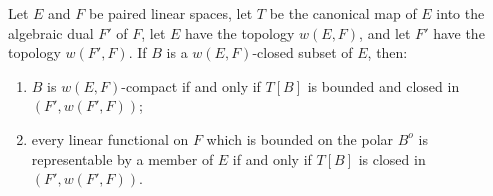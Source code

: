 Let $E$ and $F$ be paired linear spaces, let $T$ be the canonical map of $E$ into the algebraic dual $F'$ of $F$, let $E$ have the topology $w(E,F)$, and let $F'$ have the topology $w(F',F)$. If $B$ is a $w(E,F)$-closed subset of $E$, then:

\begin{enumerate}
\item[(a)] $B$ is $w(E,F)$-compact if and only if $T[B]$ is bounded and closed in $(F', w(F',F))$;
\item[(b)] every linear functional on $F$ which is bounded on the polar $B^{o}$ is representable by a member of $E$ if and only if $T[B]$ is closed in $(F', w(F',F))$.
\end{enumerate}
